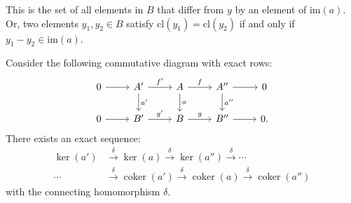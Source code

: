 This is the set of all elements in \( B \) that differ from \( y \) by an element of \( \text{im}(a) \). Or, two elements \( y_1, y_2 \in B \) satisfy \( \text{cl}(y_1) = \text{cl}(y_2) \) if and only if \( y_1 - y_2 \in \text{im}(a) \).

\begin{lemma}{\cite[Snake Lemma 1.3.2]{Weibel1994}}
	\label{snake}
	Consider the following commutative diagram with exact rows:
	\begin{equation}
		\begin{tikzcd}
			0 \arrow[r] & A' \arrow[r, "f'"] \arrow[d, "a'"] & A \arrow[r, "f"] \arrow[d, "a"] & A'' \arrow[r] \arrow[d, "a''"] & 0 \\
			0 \arrow[r] & B' \arrow[r, "g'"] & B \arrow[r, "g"] & B'' \arrow[r] & 0.
		\end{tikzcd}
	\end{equation}
	There exists an exact sequence:
	\begin{align}
		 \ker(a') &\xrightarrow{\delta} \ker(a) \xrightarrow{\delta} \ker(a'') \xrightarrow{\delta} \cdots                                                 \\
		 \cdots &\xrightarrow{\delta} \operatorname{coker}(a') \xrightarrow{\delta} \operatorname{coker}(a) \xrightarrow{\delta} \operatorname{coker}(a'') 
	\end{align}
	with the connecting homomorphism \(\delta\).
\end{lemma}

